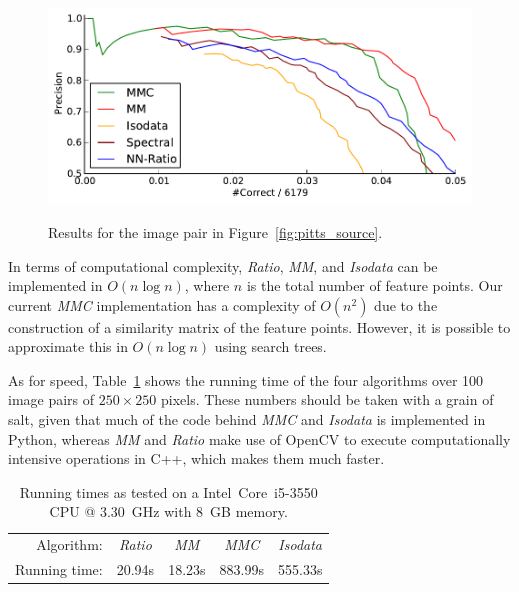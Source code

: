 \documentclass{article}
\begin{document}
\begin{figure}[htb]
		~%
			\centering
			\includegraphics[width=0.6\columnwidth]{images/result_pitts}
	\caption{Results for the image pair in Figure~\ref{fig:pitts_source}.}
	\label{fig:result_pitts}
\end{figure}


In terms of computational complexity, \emph{Ratio}, \emph{MM}, and \emph{Isodata} can be 
implemented in $O(n\log n)$, where $n$ is the total number of feature 
points.  Our current \emph{MMC} implementation has a complexity of $O(n^2)$ due to the 
construction of a similarity matrix of the feature points. However, it is 
possible to approximate this in $O(n\log n)$ using search trees.  

As for speed, Table~\ref{table:running_times} shows the running time of 
the four algorithms over 100 image pairs of $250\!\times\!250$ pixels.  
These numbers should be taken with a grain of salt, given that much of 
the code behind \emph{MMC} and \emph{Isodata} is implemented in Python, 
whereas \emph{MM} and \emph{Ratio} make use of OpenCV to execute 
computationally intensive operations in C++, which makes them much 
faster. 

\begin{table}[htb]
\caption{Running times as tested on a Intel\textregistered\ Core\texttrademark\ i5-3550 CPU @ 
3.30~GHz with 8~GB memory.}
\label{table:running_times}
	\centering
\begin{tabular}{r*{4}{c}}
\hline
	Algorithm: & \emph{Ratio} & \emph{MM} & \emph{MMC} & \emph{Isodata} 
	\\
	\noalign{\smallskip} 
	Running time: & 20.94s & 18.23s & 883.99s & 555.33s \\
	\hline
\end{tabular}
\end{table}
%
\end{document}
